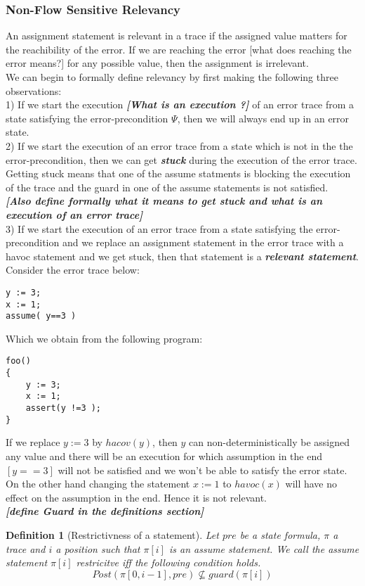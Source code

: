 \documentclass{article}
\newtheorem{mydef}{Definition}
\begin{document}
\subsubsection{Non-Flow Sensitive Relevancy}
An assignment statement is relevant in a trace if the assigned value matters for the reachibility of the error. If we are reaching the error [what does reaching the error means?] for any possible value, then the assignment is irrelevant.\\
We can begin to formally define relevancy by first making the following three observations:\\
1) If we start the execution \textbf{\textit{[What is an execution ?]}} of an error trace from a state satisfying the error-precondition $\Psi$, then we will always end up in an error state. \\
2) If we start the execution of an error trace from a state which is not in the the error-precondition, then we can get \textit{\textbf{stuck}} during the execution of the error trace. Getting stuck means that one of the assume statments is blocking the execution of the trace and the guard in one of the assume statements is not satisfied. \\
\textbf{\textit{[Also define formally what it means to get stuck and what is an execution of an error trace]}}\\
3) If we start the execution of an error trace from a state satisfying the error-precondition and we replace an assignment statement in the error trace with a havoc statement and we get stuck, then that statement is a \textit{\textbf{relevant statement}}.\\
Consider the error trace below:
\begin{lstlisting}
y := 3;
x := 1;
assume( y==3 )
\end{lstlisting}
Which we obtain from the following program:
\begin{lstlisting}
foo()
{
	y := 3;
	x := 1;
	assert(y !=3 );
}
\end{lstlisting}
If we replace $y:=3$ by $hacov(y)$, then $y$ can non-deterministically be assigned any value and there will be an execution for which assumption in the end $[y==3]$ will not be satisfied and we won't be able to satisfy the error state.\\
On the other hand changing the statement $x := 1$ to $havoc(x)$ will have no effect on the assumption in the end. Hence it is not relevant.\\
\textit{\textbf{[define Guard in the definitions section]}}
\begin{mydef}[Restrictivness of a statement]
Let $pre$ be a state formula, $\pi$ a trace and $i$ a position such that $\pi[i]$ is an assume statement. We call the assume statement $\pi[i]$ \emph{restricitve} iff the following condition holds.
$$Post(\pi[0,i-1], pre) \not \subseteq guard(\pi[i])$$
\end{mydef}
\end{document}
